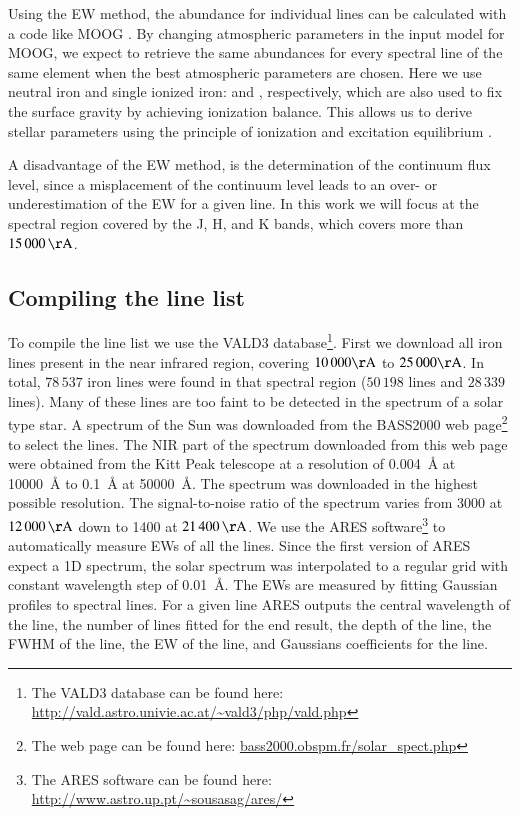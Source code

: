 \documentclass{aa}
\begin{document}
Using the EW method, the abundance for individual lines can be
calculated with a code like MOOG \citep{Sneden1973}. By changing
atmospheric parameters in the input model for MOOG, we expect to
retrieve the same abundances for every spectral line of the same
element when the best atmospheric parameters are chosen. Here we use
neutral iron and single ionized iron:  and ,
respectively, which are also used to fix the surface gravity by
achieving ionization balance. This allows us to derive stellar
parameters using the principle of ionization and excitation equilibrium
\citep{Gray2006}.

A disadvantage of the EW method, is the determination of the continuum
flux level, since a misplacement of the continuum level leads to an
over- or underestimation of the EW for a given line. In this work we
will focus at the spectral region covered by the J, H, and K bands,
which covers more than $\SI{15000}{\AA}$.



\subsection{Compiling the line list}

To compile the line list we use the VALD3
database\footnote{The VALD3 database can be found here:
\url{http://vald.astro.univie.ac.at/~vald3/php/vald.php}}. First we
download all iron lines present in the near infrared region, covering
$10\,000\si{\AA}$ to $25\,000\si{\AA}$. In total, $78\,537$ iron lines
were found in that spectral region ($50\,198$  lines and
$28\,339$  lines). Many of these lines are too faint to be
detected in the spectrum of a solar type star. A spectrum of the Sun
was downloaded from the BASS2000 web page\footnote{The web page can
be found here: \url{bass2000.obspm.fr/solar_spect.php}} to select the
lines. The NIR part of the spectrum downloaded from this web page were
obtained from the Kitt Peak telescope \citep{Hinkle1995} at a resolution
of \SI{0.004}{\angstrom} at \SI{10000}{\angstrom} to \SI{0.1}{\angstrom}
at \SI{50000}{\angstrom}. The spectrum was downloaded in the highest
possible resolution. The signal-to-noise ratio of the spectrum varies
from 3000 at $\SI{12000}{\AA}$ down to 1400 at $\SI{21400}{\AA}$. We
use the ARES software\footnote{The ARES software can be found here:
\url{http://www.astro.up.pt/~sousasag/ares/}}\citep{Sousa2007,Sousa2015a
} to automatically measure EWs of all the lines. Since the first version
of ARES expect a 1D spectrum, the solar spectrum was interpolated to a
regular grid with constant wavelength step of \SI{0.01}{\angstrom}. The
EWs are measured by fitting Gaussian profiles to spectral lines. For a
given line ARES outputs the central wavelength of the line, the number
of lines fitted for the end result, the depth of the line, the FWHM of
the line, the EW of the line, and Gaussians coefficients for the line.
\end{document}
